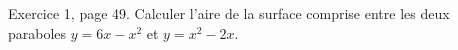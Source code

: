 \begin{exercice}\label{exo0022}

Exercice 1, page 49. Calculer l'aire de la surface comprise entre les deux paraboles $y=6x-x^2$ et $y=x^2-2x$.

\end{exercice}
